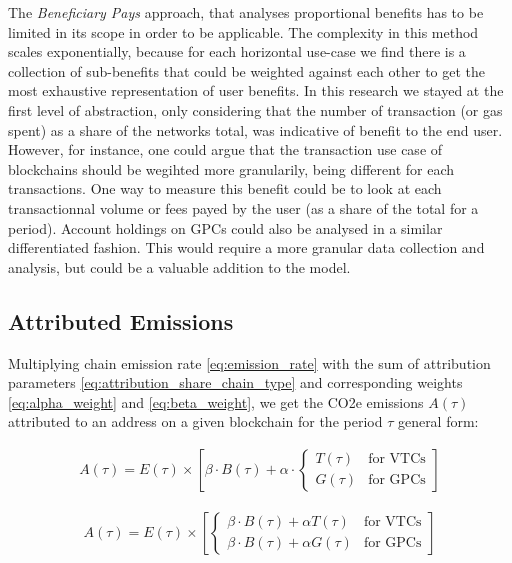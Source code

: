 \documentclass[11pt]{report}
\begin{document}
The \textit{Beneficiary Pays} approach, that analyses proportional benefits has to be limited in its scope in order to be applicable. The complexity in this method scales exponentially, because for each horizontal use-case we find there is a collection of sub-benefits that could be weighted against each other to get the most exhaustive representation of user benefits. In this research we stayed at the first level of abstraction, only considering that the number of transaction (or gas spent) as a share of the networks total, was indicative of benefit to the end user. However, for instance, one could argue that the transaction use case of blockchains should be wegihted more granularily, being different for each transactions. One way to measure this benefit could be to look at each transactionnal volume or fees payed by the user (as a share of the total for a period). Account holdings on GPCs could also be analysed in a similar differentiated fashion. This would require a more granular data collection and analysis, but could be a valuable addition to the model.



\subsection{Attributed Emissions}

Multiplying chain emission rate \eqref{eq:emission_rate} with the sum of attribution parameters \eqref{eq:attribution_share_chain_type} and corresponding weights \eqref{eq:alpha_weight} and \eqref{eq:beta_weight}, we get the CO2e emissions \(A(\tau)\) attributed to an address on a given blockchain for the period $\tau$ general form:


\begin{align}
    A(\tau) = E(\tau) \times \left[\beta \cdot B(\tau) + \alpha \cdot \begin{cases}
                                                                              T(\tau) & \text{for VTCs} \\
                                                                              G(\tau) & \text{for GPCs}
                                                                          \end{cases}\right]
\end{align}

\begin{align}
    A(\tau) = E(\tau) \times \left[\begin{cases}
                                           \beta \cdot B(\tau) + \alpha T(\tau)  & \text{for VTCs} \\
                                           \beta \cdot B(\tau) +  \alpha G(\tau) & \text{for GPCs}
                                       \end{cases}\right]
\end{align}
\end{document}
